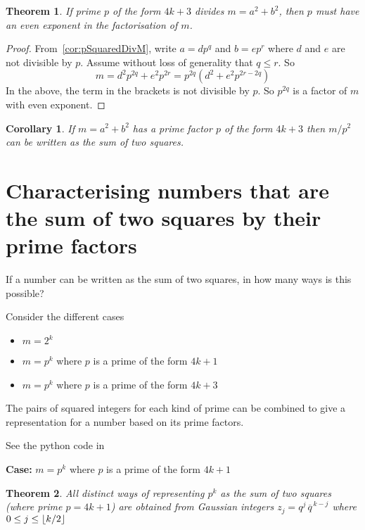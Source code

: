 \documentclass[11pt]{amsart}
\newtheorem{theorem}{Theorem}[section]
\newtheorem{corollary}{Corollary}[section]
\begin{document}
\begin{theorem}
\label{thm:pIs4kPlus3EvenExponentInM}
If prime $p$ of the form $4k+3$ divides $m = a^{2} + b^{2}$, then $p$ must have an even exponent in the factorisation of $m$.
\end{theorem}

\begin{proof}
From~\cref{cor:pSquaredDivM}, write $a = d p^{q}$ and $b = e p^{r}$ where $d$ and $e$ are not divisible by $p$. Assume without loss of generality that $q \le r$.
So 
$$
m  = d^{2} p^{2q} + e^{2} p^{2r} = 
p^{2q} \left( d^{2} + e^{2} p^{2r-2q} \right)
$$
In the above, the term in the brackets is not divisible by $p$. So $p^{2q}$ is a factor of $m$ with even exponent.
\end{proof}


\begin{corollary}

If $m = a^2+b^2$ has a prime factor $p$ of the form $4k+3$ then $m/p^2$ can be written as the sum of two squares.

\end{corollary}

\section{Characterising numbers that are the sum of two squares by their prime factors}


If a number can be written as the sum of two squares, in how many ways is this possible?


Consider the different cases
\begin{itemize}
\item
$m = 2^{k}$
\item
$m = p^{k}$ where $p$ is a prime of the form $4k+1$
\item
$m = p^{k}$ where $p$ is a prime of the form $4k+3$
\end{itemize}

\vspace{1em}

The pairs of squared integers for each kind of prime can be combined to give a representation for a number based on its prime factors.

See the python code in 


\vspace{2em}

\textbf{Case:} $m = p^{k}$ where $p$ is a prime of the form $4k+1$

\begin{theorem}
All distinct ways of representing $p^{k}$ as the sum of two squares (where prime $p=4k+1$) are obtained from Gaussian integers $z_{j} = q^{j} \, \overline{q}^{\,k - j}$ where  $0 \le j \le  \left\lfloor {k/2} \right\rfloor $
\end{theorem}
\end{document}
